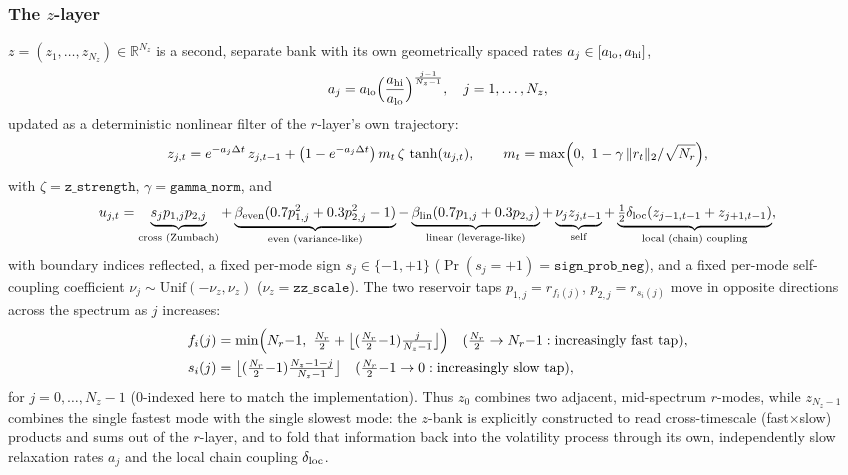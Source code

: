 \documentclass[11pt,a4paper]{article}
\begin{document}
\subsubsection{The $z$-layer}

$z=(z_1,\ldots,z_{N_z})\in\mathbb{R}^{N_z}$ is a second, separate bank
with its own geometrically spaced rates $a_j\in[a_{\rm lo},a_{\rm hi}]$,
\begin{equation}
  a_j = a_{\rm lo}\Bigl(\frac{a_{\rm hi}}{a_{\rm lo}}\Bigr)^{\frac{j-1}{N_z-1}},\quad j=1,\ldots,N_z,
  \label{eq:zrates}
\end{equation}
updated as a deterministic nonlinear filter of the $r$-layer's own
trajectory:
\begin{equation}
  z_{j,t} = e^{-a_j\Delta t}\,z_{j,t-1} + \bigl(1-e^{-a_j\Delta t}\bigr)\,m_t\,\zeta\,\tanh(u_{j,t}),
  \qquad
  m_t = \max\Bigl(0,\ 1-\gamma\,\|r_t\|_2/\sqrt{N_r}\Bigr),
  \label{eq:zupdate}
\end{equation}
with $\zeta=\texttt{z\_strength}$, $\gamma=\texttt{gamma\_norm}$, and
\begin{equation}
  u_{j,t} = \underbrace{s_jp_{1,j}p_{2,j}}_{\text{cross (Zumbach)}}
          + \underbrace{\beta_{\rm even}(0.7p_{1,j}^2+0.3p_{2,j}^2-1)}_{\text{even (variance-like)}}
          - \underbrace{\beta_{\rm lin}(0.7p_{1,j}+0.3p_{2,j})}_{\text{linear (leverage-like)}}
          + \underbrace{\nu_jz_{j,t-1}}_{\text{self}}
          + \underbrace{\tfrac12\delta_{\rm loc}(z_{j-1,t-1}+z_{j+1,t-1})}_{\text{local (chain) coupling}},
  \label{eq:preact}
\end{equation}
with boundary indices reflected, a fixed per-mode sign
$s_j\in\{-1,+1\}$ ($\Pr(s_j{=}+1)=\texttt{sign\_prob\_neg}$), and a
fixed per-mode self-coupling coefficient
$\nu_j\sim\mathrm{Unif}(-\nu_z,\nu_z)$ ($\nu_z=\texttt{zz\_scale}$).
The two reservoir taps $p_{1,j}=r_{f_i(j)}$, $p_{2,j}=r_{s_i(j)}$ move
in opposite directions across the spectrum as $j$ increases:
\begin{align}
  f_i(j) &= \min\Bigl(N_r{-}1,\ \tfrac{N_r}{2}+\bigl\lfloor(\tfrac{N_r}{2}{-}1)\tfrac{j}{N_z-1}\bigr\rfloor\Bigr)
  \quad(\tfrac{N_r}{2}\to N_r{-}1: \text{increasingly fast tap}), \label{eq:fi}\\
  s_i(j) &= \bigl\lfloor(\tfrac{N_r}{2}{-}1)\tfrac{N_z-1-j}{N_z-1}\bigr\rfloor
  \quad(\tfrac{N_r}{2}{-}1\to0: \text{increasingly slow tap}), \label{eq:si}
\end{align}
for $j=0,\ldots,N_z{-}1$ (0-indexed here to match the implementation).
Thus $z_0$ combines two adjacent, mid-spectrum $r$-modes, while
$z_{N_z-1}$ combines the single fastest mode with the single slowest
mode: the $z$-bank is explicitly constructed to read cross-timescale
(fast$\times$slow) products and sums out of the $r$-layer, and to fold
that information back into the volatility process through its own,
independently slow relaxation rates $a_j$ and the local chain coupling
$\delta_{\rm loc}$.
\end{document}
